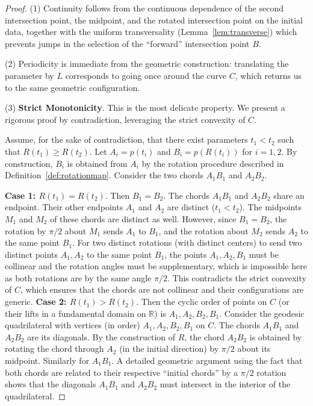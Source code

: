 \documentclass{article}
\begin{document}
\begin{proof}
    (1) Continuity follows from the continuous dependence of the second intersection point, the midpoint, and the rotated intersection point on the initial data, together with the uniform transversality (Lemma~\ref{lem:transverse}) which prevents jumps in the selection of the “forward” intersection point $B$.

    (2) Periodicity is immediate from the geometric construction: translating the parameter by $L$ corresponds to going once around the curve $C$, which returns us to the same geometric configuration.

    (3) \textbf{Strict Monotonicity}. This is the most delicate property. We present a rigorous proof by contradiction, leveraging the strict convexity of $C$.

    Assume, for the sake of contradiction, that there exist parameters $t_1 < t_2$ such that $R(t_1) \geq R(t_2)$. Let $A_i = p(t_i)$ and $B_i = p(R(t_i))$ for $i=1,2$. By construction, $B_i$ is obtained from $A_i$ by the rotation procedure described in Definition~\ref{def:rotationmap}. Consider the two chords $A_1B_1$ and $A_2B_2$.

    \textbf{Case 1: $R(t_1) = R(t_2)$}. Then $B_1 = B_2$. The chords $A_1B_1$ and $A_2B_2$ share an endpoint. Their other endpoints $A_1$ and $A_2$ are distinct ($t_1 < t_2$). The midpoints $M_1$ and $M_2$ of these chords are distinct as well. However, since $B_1 = B_2$, the rotation by $\pi/2$ about $M_1$ sends $A_1$ to $B_1$, and the rotation about $M_2$ sends $A_2$ to the same point $B_1$. For two distinct rotations (with distinct centers) to send two distinct points $A_1, A_2$ to the same point $B_1$, the points $A_1, A_2, B_1$ must be collinear and the rotation angles must be supplementary, which is impossible here as both rotations are by the same angle $\pi/2$. This contradicts the strict convexity of $C$, which ensures that the chords are not collinear and their configurations are generic.
    \textbf{Case 2: $R(t_1) > R(t_2)$}. Then the cyclic order of points on $C$ (or their lifts in a fundamental domain on $\mathbb{R}$) is $A_1, A_2, B_2, B_1$. Consider the geodesic quadrilateral with vertices (in order) $A_1, A_2, B_2, B_1$ on $C$. The chords $A_1B_1$ and $A_2B_2$ are its diagonals. By the construction of $R$, the chord $A_2B_2$ is obtained by rotating the chord through $A_2$ (in the initial direction) by $\pi/2$ about its midpoint. Similarly for $A_1B_1$. A detailed geometric argument using the fact that both chords are related to their respective “initial chords” by a $\pi/2$ rotation shows that the diagonals $A_1B_1$ and $A_2B_2$ must intersect in the interior of the quadrilateral.


\end{proof}
\end{document}
